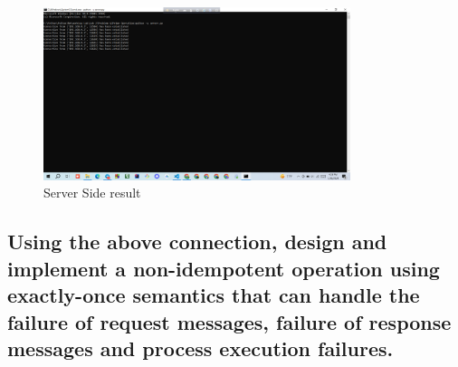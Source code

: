 \documentclass[11pt]{article}
\begin{document}
\begin{itemize}
    \begin{figure}[H]
      \centering
      \includegraphics[width=0.8\textwidth]{prime_result.server.png}
      \caption{Server Side result}
      \label{fig:4}
    \end{figure}

\end{itemize}




\subsection{Using the above connection, design and implement a non-idempotent operation using exactly-once semantics that can handle the failure of request messages, failure of response messages
and process execution failures.}
\end{document}
